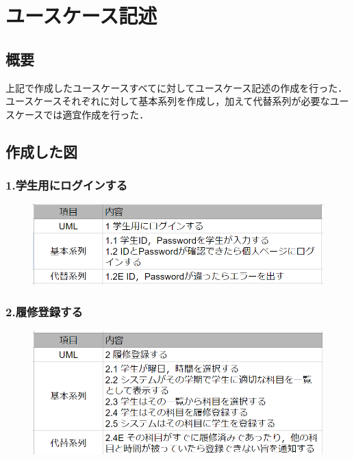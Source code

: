 \documentclass[documentclass]{jsarticle}
\begin{document}
\newpage

\section{ユースケース記述}
\subsection*{概要}
上記で作成したユースケースすべてに対してユースケース記述の作成を行った．
ユースケースそれぞれに対して基本系列を作成し，加えて代替系列が必要なユースケースでは適宜作成を行った．

\subsection*{作成した図}
\subsubsection*{1.学生用にログインする}
\begin{figure}[H]
  \includegraphics*[scale=0.4]{figure/4-1.png}
\end{figure}

\subsubsection*{2.履修登録する}
\begin{figure}[H]
  \includegraphics*[scale=0.4]{figure/4-2.png}
\end{figure}
\end{document}
